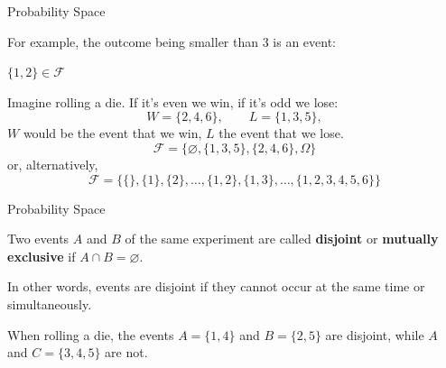 \documentclass{beamer}
\newcommand{\F}{\mathcal{F}}
\begin{document}
\begin{frame}{Probability Space}
        \begin{example}
            For example, the outcome being smaller than 3 is an event:\\
            \begin{center}
                $\{1,2\} \in \mathcal{F}$
            \end{center}
        \end{example}

\begin{example}
    Imagine rolling a die. If it's even we win, if it's odd we lose:
    \[W = \{2,4,6\},\qquad
    L = \{1,3,5\},\]
    $W$ would be the event that we win, $L$ the event that we lose.
    \[ \F = \{ \varnothing, \{1,3,5\},\{2,4,6\},\Omega\} \]
or, alternatively, 
\[
\F=\{\{\}, \{1\},\{2\},\dots,\{1,2\},\{1,3\},\dots,\{1,2,3,4,5,6\}\}
\]
\end{example}


\end{frame}

\begin{frame}{Probability Space}

 \begin{definition}
   Two events $A$ and $B$ of the same experiment are called \textbf{disjoint} or \textbf{mutually exclusive} if $A\cap B=\varnothing$.
    \end{definition}
In other words, events are disjoint if they cannot occur at the same time or simultaneously.\pause
\begin{example}
    When rolling a die, the events $A=\{1,4\}$ and $B=\{2,5\}$ are disjoint, while $A$ and $C=\{3,4,5\}$ are not.
\end{example}
\end{frame}
\end{document}
